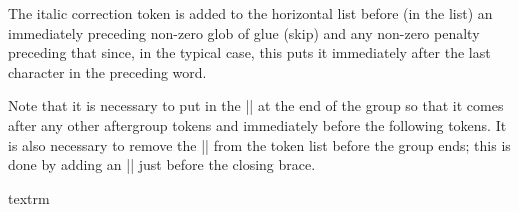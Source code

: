     The italic correction token is added to the horizontal list
    before (in the list) an immediately preceding non-zero glob of
    glue (skip) and any non-zero penalty preceding that since, in
    the typical case, this puts it immediately
    after the last character in the preceding word.

    Note that it is necessary to put in the |\aftergroup\maybe@ic| at
    the end of the group so that it comes after any other aftergroup
    tokens and immediately before the following tokens.
    It is also necessary to remove the |\fi| from the token list before
    the group ends; this is done by adding an |\expandafter| just
    before the closing brace.
%
\begin{teX}
\def \DeclareTextFontCommand #1#2{%
  \DeclareRobustCommand#1[1]{%
    \ifmmode
      \nfss@text{#2##1}%
    \else
      \hmode@bgroup
       \text@command{##1}%
       #2\check@icl ##1\check@icr
       \expandafter
      \egroup
    \fi
  }%
}
\end{teX}

%
\begin{docCommand}{textrm}{}
\begin{teX}
\DeclareTextFontCommand{\textrm}{\rmfamily}
\end{teX}
\end{docCommand}

